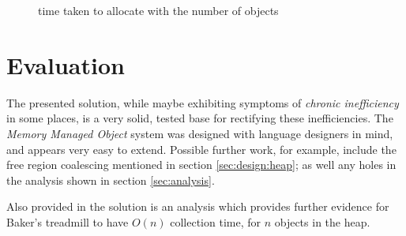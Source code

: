 \documentclass[]{article}
\begin{document}
\begin{figure}[!htbp]
	\begin{center}
		\caption{time taken to allocate with the number of objects\label{fig:analysis:insertion}}
	\end{center}
\end{figure}

\section{Evaluation}\label{sec:evaluation}
The presented solution, while maybe exhibiting symptoms of \emph{chronic inefficiency} in some places, is a very solid, tested base for rectifying these inefficiencies. The \emph{Memory Managed Object} system was designed with language designers in mind, and appears very easy to extend. Possible further work, for example, include the free region coalescing mentioned in section \ref{sec:design:heap}; as well any holes in the analysis shown in section \ref{sec:analysis}.

Also provided in the solution is an analysis which provides further evidence for Baker's treadmill to have $O(n)$ collection time, for $n$ objects in the heap.

\nocite{*}


\end{document}

